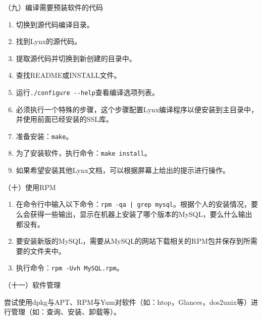 \vspace{0.1in}
（九）编译需要预装软件的代码
\begin{enumerate}
  \item 切换到源代码编译目录。
  \item 找到Lynx的源代码。
  \item 提取源代码并切换到新创建的目录中。
  \item 查找README或INSTALL文件。
  \item 运行\verb|./configure --help|查看编译选项列表。
  \item 必须执行一个特殊的步骤，这个步骤配置Lynx编译程序以便安装到主目录中，并使用前面已经安装的SSL库。
  \item 准备安装：\verb|make|。
  \item 为了安装软件，执行命令：\verb|make install|。
  \item 如果希望安装其他Lynx文档，可以根据屏幕上给出的提示进行操作。
\end{enumerate}

\vspace{0.1in}
（十）使用RPM
\begin{enumerate}
  \item 在命令行中输入以下命令：\verb=rpm -qa | grep mysql=。根据个人的安装情况，要么会获得一些输出，显示在机器上安装了哪个版本的MySQL，要么什么输出都没有。
  \item 要安装新版的MySQL，需要从MySQL的网站下载相关的RPM包并保存到所需要的文件夹中。
  \item 执行命令：\verb|rpm -Uvh MySQL.rpm|。
\end{enumerate}

\vspace{0.1in}
（十一）软件管理

尝试使用dpkg与APT、RPM与Yum对软件（如：htop，Glances，dos2unix等）进行管理（如：查询、安装、卸载等）。

